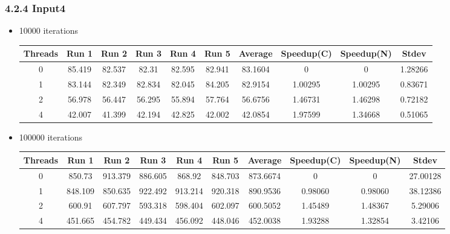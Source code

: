 \documentclass{article}
\begin{document}
\subsubsection*{4.2.4 Input4} 
 \begin{itemize}
\item 10000 iterations
\begin{center}
 \begin{adjustbox}{width=\columnwidth, center} 
 \begin{tabular}{ | |c | c c c c c | c | c c | c | |} \hline 
 Threads & Run 1 & Run 2 & Run 3 & Run 4 & Run 5 & Average & Speedup(C) & Speedup(N) & Stdev \\ [0.5ex] 
 \hline 
 \hline 
0& 85.419 & 82.537 & 82.31 & 82.595 & 82.941 & 83.1604 & 0 & 0 & 1.28266\\ 
 \hline
1& 83.144 & 82.349 & 82.834 & 82.045 & 84.205 & 82.9154 & 1.00295 & 1.00295 & 0.83671\\ 
 \hline
2& 56.978 & 56.447 & 56.295 & 55.894 & 57.764 & 56.6756 & 1.46731 & 1.46298 & 0.72182\\ 
 \hline
4& 42.007 & 41.399 & 42.194 & 42.825 & 42.002 & 42.0854 & 1.97599 & 1.34668 & 0.51065\\ 
 \hline
\end{tabular} 
 \end{adjustbox} 
 \end{center} 
\item 100000 iterations
\begin{center}
 \begin{adjustbox}{width=\columnwidth, center} 
 \begin{tabular}{ | |c | c c c c c | c | c c | c | |} \hline 
 Threads & Run 1 & Run 2 & Run 3 & Run 4 & Run 5 & Average & Speedup(C) & Speedup(N) & Stdev \\ [0.5ex] 
 \hline 
 \hline 
0& 850.73 & 913.379 & 886.605 & 868.92 & 848.703 & 873.6674 & 0 & 0 & 27.00128\\ 
 \hline
1& 848.109 & 850.635 & 922.492 & 913.214 & 920.318 & 890.9536 & 0.98060 & 0.98060 & 38.12386\\ 
 \hline
2& 600.91 & 607.797 & 593.318 & 598.404 & 602.097 & 600.5052 & 1.45489 & 1.48367 & 5.29006\\ 
 \hline
4& 451.665 & 454.782 & 449.434 & 456.092 & 448.046 & 452.0038 & 1.93288 & 1.32854 & 3.42106\\ 
 \hline
\end{tabular} 
 \end{adjustbox} 
 \end{center} 
\end{itemize}
\end{document}
